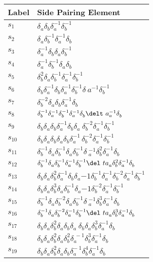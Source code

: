 \documentclass{article}
\begin{document}
\begin{center}
\begin{tabular}{ll}
\bottomrule
\end{tabular}
\hfill
\begin{tabular}{ll}
\toprule
Label & Side Pairing Element\\
\midrule
$s_{1}$ & $\delta_a^{}\delta_b^{}\delta_a^{-1}\delta_b^{-1}$ \\
$s_{2}$ & $\delta_a^{}\delta_b^{-1}\delta_a^{-1}\delta_b^{}$ \\
$s_{3}$ & $\delta_a^{-1}\delta_b^{}\delta_a^{}\delta_b^{-1}$ \\
$s_{4}$ & $\delta_a^{-1}\delta_b^{-1}\delta_a^{}\delta_b^{}$ \\
$s_{5}$ & $\delta_b^{2}\delta_a^{}\delta_b^{-1}\delta_a^{-1}\delta_b^{-1}$ \\
$s_{6}$ & $\delta_b^{}\delta_a^{-1}\delta_b^{}\delta_a^{-1}\delta_b^{-1}\delta_\
a^{-1}\delta_b^{-1}$ \\
$s_{7}$ & $\delta_b^{-2}\delta_a^{}\delta_b^{}\delta_a^{-1}\delta_b^{}$ \\
$s_{8}$ & $\delta_b^{-1}\delta_a^{-1}\delta_b^{-1}\delta_a^{-1}\delta_b^{}\delt\
a_a^{-1}\delta_b^{}$ \\
$s_{9}$ & $\delta_b^{}\delta_a^{}\delta_b^{}\delta_a^{-1}\delta_b^{}\delta_a^{}\
\delta_b^{-2}\delta_a^{-1}\delta_b^{-1}$ \\
$s_{10}$ & $\delta_b^{}\delta_a^{}\delta_b^{}\delta_a^{}\delta_b^{}\delta_a^{-1\
}\delta_b^{-2}\delta_a^{-1}\delta_b^{-1}$ \\
$s_{11}$ & $\delta_b^{-1}\delta_a^{}\delta_b^{-1}\delta_a^{}\delta_b^{-1}\delta\
_a^{-1}\delta_b^{2}\delta_a^{-1}\delta_b^{}$ \\
$s_{12}$ & $\delta_b^{-1}\delta_a^{}\delta_b^{-1}\delta_a^{-1}\delta_b^{-1}\del\
ta_a^{}\delta_b^{2}\delta_a^{-1}\delta_b^{}$ \\
$s_{13}$ & $\delta_b^{}\delta_a^{}\delta_b^{2}\delta_a^{-1}\delta_b^{}\delta_a^\
{-1}\delta_b^{-1}\delta_a^{-1}\delta_b^{-2}\delta_a^{-1}\delta_b^{-1}$ \\
$s_{14}$ & $\delta_b^{}\delta_a^{}\delta_b^{3}\delta_a^{}\delta_b^{-1}\delta_a^\
{-1}\delta_b^{-2}\delta_a^{-1}\delta_b^{-1}$ \\
$s_{15}$ & $\delta_b^{-1}\delta_a^{}\delta_b^{-2}\delta_a^{}\delta_b^{-1}\delta\
_a^{-1}\delta_b^{3}\delta_a^{-1}\delta_b^{}$ \\
$s_{16}$ & $\delta_b^{-1}\delta_a^{}\delta_b^{-2}\delta_a^{-1}\delta_b^{-1}\del\
ta_a^{}\delta_b^{3}\delta_a^{-1}\delta_b^{}$ \\
$s_{17}$ & $\delta_b^{}\delta_a^{}\delta_b^{2}\delta_a^{}\delta_b^{}\delta_a^{}\
\delta_b^{}\delta_a^{}\delta_b^{3}\delta_a^{-1}\delta_b^{}$ \\
$s_{18}$ & $\delta_b^{}\delta_a^{}\delta_b^{2}\delta_a^{}\delta_b^{2}\delta_a^{\
-1}\delta_b^{3}\delta_a^{-1}\delta_b^{}$ \\
$s_{19}$ & $\delta_b^{}\delta_a^{}\delta_b^{2}\delta_a^{}\delta_b^{}\delta_a^{-\
1}\delta_b^{4}\delta_a^{-1}\delta_b^{}$ \\
\bottomrule
\end{tabular}
\end{center}

\thispagestyle{empty}
\end{document}

